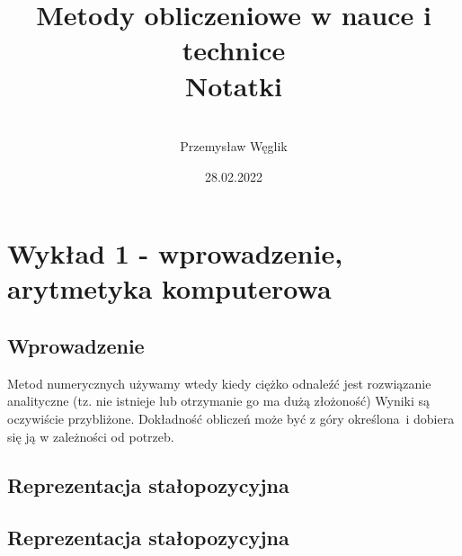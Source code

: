 \documentclass[12pt,a4paper,openright]{mwrep}
\begin{document}
\title{%
Metody obliczeniowe w nauce i technice\\
Notatki
}

\author{\\Przemysław Węglik}

\date{28.02.2022}

\maketitle

\tableofcontents



\chapter{Wykład 1 - wprowadzenie, arytmetyka komputerowa}

\section{Wprowadzenie}
Metod numerycznych używamy wtedy kiedy ciężko odnaleźć jest
rozwiązanie analityczne (tz. nie istnieje lub otrzymanie go ma dużą złożoność)
Wyniki są oczywiście przybliżone. Dokładność obliczeń może być z góry określona~i
dobiera się ją w zależności od potrzeb.

\section{Reprezentacja stałopozycyjna}

\section{Reprezentacja stałopozycyjna}
\end{document}
